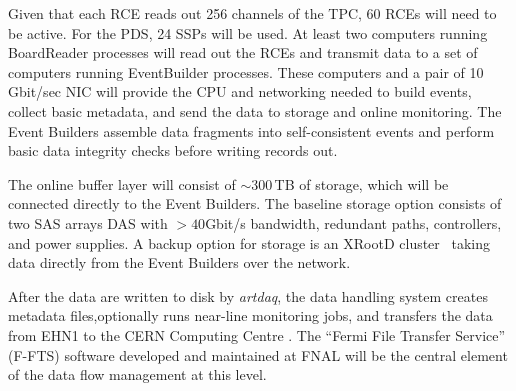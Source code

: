 
Given that each RCE reads out 256 channels of the TPC, 60 RCEs
will need to be active.  For the PDS, 24 SSPs will be used.  At least two computers 
running BoardReader processes will read out
the RCEs and transmit data to a set of computers running EventBuilder processes.
These computers and a
pair of 10\,Gbit/sec NIC will provide the CPU and networking needed to
build events, collect basic metadata, and send the data to storage and
online monitoring.  
The Event Builders assemble data fragments into self-consistent events and perform basic data integrity checks before writing records out.

The online buffer layer will consist of $\sim$300\,TB of storage,
which will be connected directly to the Event Builders.  The baseline
storage option consists of two SAS arrays DAS with $>40$Gbit/s bandwidth,
redundant paths, controllers, and power supplies.
A backup option for storage is an XRootD cluster~\cite{xrootd} taking
data directly from the Event Builders over the network.

After the data are written to disk by {\it artdaq}, the data handling
system creates metadata files,optionally  runs near-line monitoring jobs, and
transfers the data from EHN1 to the CERN Computing Centre \cite{docdb1212}.
The ``Fermi File Transfer Service'' (F-FTS) software 
developed and maintained at FNAL will be the central element
of the data flow management at this level.


